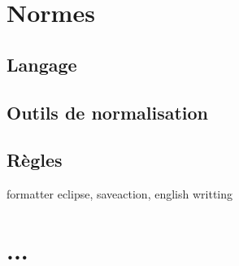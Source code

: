 \documentclass[11pt]{article}
\begin{document}
\section{Normes}

\subsection{Langage}

\subsection{Outils de normalisation}

\subsection{Règles}

formatter eclipse, saveaction, english writting

\section{...}
\end{document}
